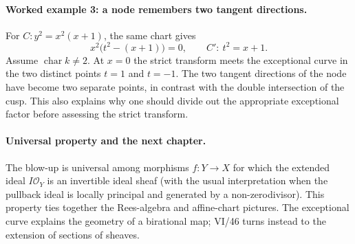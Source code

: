 \paragraph{Worked example 3: a node remembers two tangent directions.}
For $C:y^2=x^2(x+1)$, the same chart gives
\[
 x^2\bigl(t^2-(x+1)\bigr)=0,
 \qquad C':\ t^2=x+1.
\]
Assume $\operatorname{char}k\ne2$.  At $x=0$ the strict transform
meets the exceptional curve in the two distinct points $t=1$ and
$t=-1$.  The two tangent directions of the node have become two
separate points, in contrast with the double intersection of the cusp.
This also explains why one should divide out the appropriate
exceptional factor before assessing the strict transform.

\paragraph{Universal property and the next chapter.}
The blow-up is universal among morphisms $f:Y\to X$ for which
the extended ideal $I\mathcal O_Y$ is an invertible ideal sheaf
(with the usual interpretation when the pullback ideal is
locally principal and generated by a non-zerodivisor).  This
property ties together the Rees-algebra and affine-chart pictures.
The exceptional curve explains the geometry of a birational map;
VI/46 turns instead to the extension of sections of sheaves.
